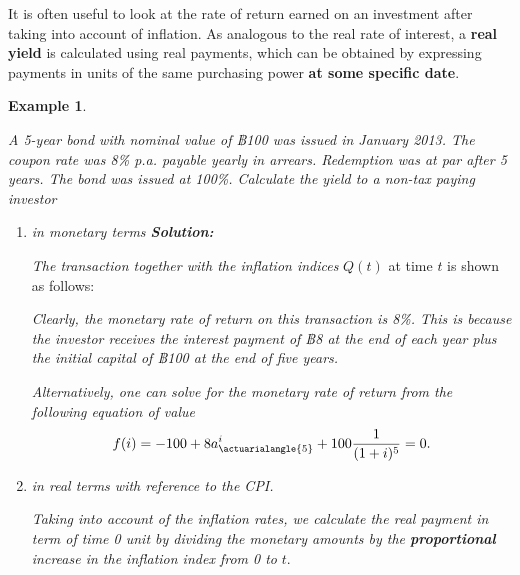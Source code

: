 \documentclass[
]{book}
\theoremstyle{definition}
\theoremstyle{definition}
\newtheorem{example}{Example}[chapter]
\theoremstyle{definition}
\theoremstyle{definition}
\theoremstyle{remark}
\begin{document}
It is often useful to look at the rate of return earned on an investment
after taking into account of inflation. As analogous to the real rate of
interest, a \textbf{real yield} is calculated using real payments, which can
be obtained by expressing payments in units of the same purchasing power
\textbf{at some specific date}.

\begin{example}
\protect\hypertarget{exm:unlabeled-div-62}{}\label{exm:unlabeled-div-62}

\emph{A 5-year bond with nominal value of ฿100 was issued in January 2013.
The coupon rate was 8\% p.a. payable yearly in arrears. Redemption was at
par after 5 years. The bond was issued at 100\%. Calculate the yield to a
non-tax paying investor}

\begin{enumerate}
\def\labelenumi{\arabic{enumi}.}
\item
  \emph{in monetary terms \textbf{Solution:}}

  \emph{The transaction together with the inflation indices} \(Q(t)\) at time
  \(t\) is shown as follows:

  \emph{Clearly, the monetary rate of return on this transaction is 8\%.
  This is because the investor receives the interest payment of ฿8 at
  the end of each year plus the initial capital of ฿100 at the end of
  five years.}

  \emph{Alternatively, one can solve for the monetary rate of return from
  the following equation of value}
  \[f(i) = -100 + 8 a^i_{\actuarialangle{5}} + 100\frac{1}{(1+i)^5} = 0.\]
\item
  \emph{in real terms with reference to the CPI.}

  \emph{Taking into account of the inflation rates, we calculate the real
  payment in term of time 0 unit by dividing the monetary amounts by
  the \textbf{proportional} increase in the inflation index from 0 to} \(t\).
\end{enumerate}


\end{example}
\end{document}
